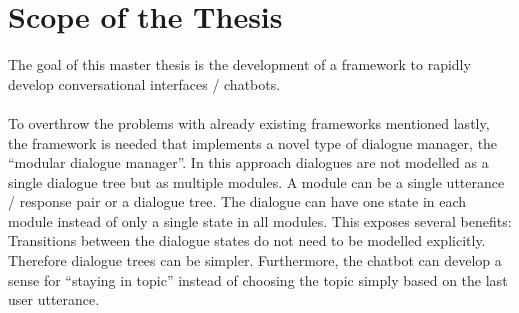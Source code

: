 \section{Scope of the Thesis}
The goal of this master thesis is the development of a framework to rapidly develop conversational interfaces / chatbots.
\\~\\
To overthrow the problems with already existing frameworks mentioned lastly, the framework is needed that implements a novel type of dialogue manager, the “modular dialogue manager”. In this approach dialogues are not modelled as a single dialogue tree but as multiple modules. A module can be a single utterance / response pair or a dialogue tree. The dialogue can have one state in each module instead of only a single state in all modules. This exposes several benefits: Transitions between the dialogue states do not need to be modelled explicitly. Therefore dialogue trees can be simpler. Furthermore, the chatbot can develop a sense for “staying in topic” instead of choosing the topic simply based on the last user utterance.

